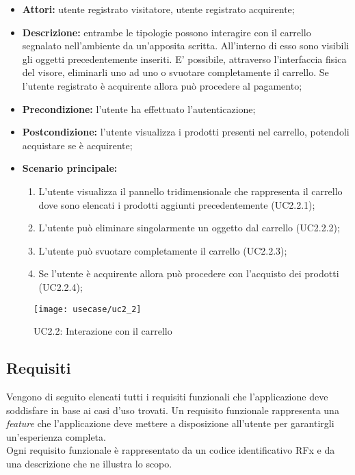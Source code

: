 \begin{itemize}
	\item \textbf{Attori:} utente registrato visitatore, utente registrato acquirente;
	\item \textbf{Descrizione:} entrambe le tipologie possono interagire con il carrello segnalato nell'ambiente da un'apposita scritta. All'interno di esso sono visibili gli oggetti precedentemente inseriti. E' possibile, attraverso l'interfaccia fisica del visore, eliminarli uno ad uno o svuotare completamente il carrello. Se l'utente registrato è acquirente allora può procedere al pagamento;
	\item \textbf{Precondizione:} l'utente ha effettuato l'autenticazione;
	\item \textbf{Postcondizione:} l'utente visualizza i prodotti presenti nel carrello, potendoli acquistare se è acquirente;
	\item \textbf{Scenario principale:}
	\begin{enumerate}
		\item L'utente visualizza il pannello tridimensionale che rappresenta il carrello dove sono elencati i prodotti aggiunti precedentemente (UC2.2.1);
		\item L'utente può eliminare singolarmente un oggetto dal carrello (UC2.2.2);
		\item L'utente può svuotare completamente il carrello (UC2.2.3);
		\item Se l'utente è acquirente allora può procedere con l'acquisto dei prodotti (UC2.2.4);
	\end{enumerate}
\end{itemize}

\label{UC2.2}
\begin{figure}[ht]
	\begin{center}
		\texttt{[image: usecase/uc2\_2]}
		\caption{UC2.2: Interazione con il carrello}
	\end{center}
\end{figure}
\FloatBarrier

\subsection{Requisiti}

Vengono di seguito elencati tutti i requisiti funzionali che l'applicazione deve soddisfare in base ai casi d'uso trovati. Un requisito funzionale rappresenta una \textit{feature} che l'applicazione deve mettere a disposizione all'utente per garantirgli un'esperienza completa. \\
Ogni requisito funzionale è rappresentato da un codice identificativo RFx e da una descrizione che ne illustra lo scopo.

